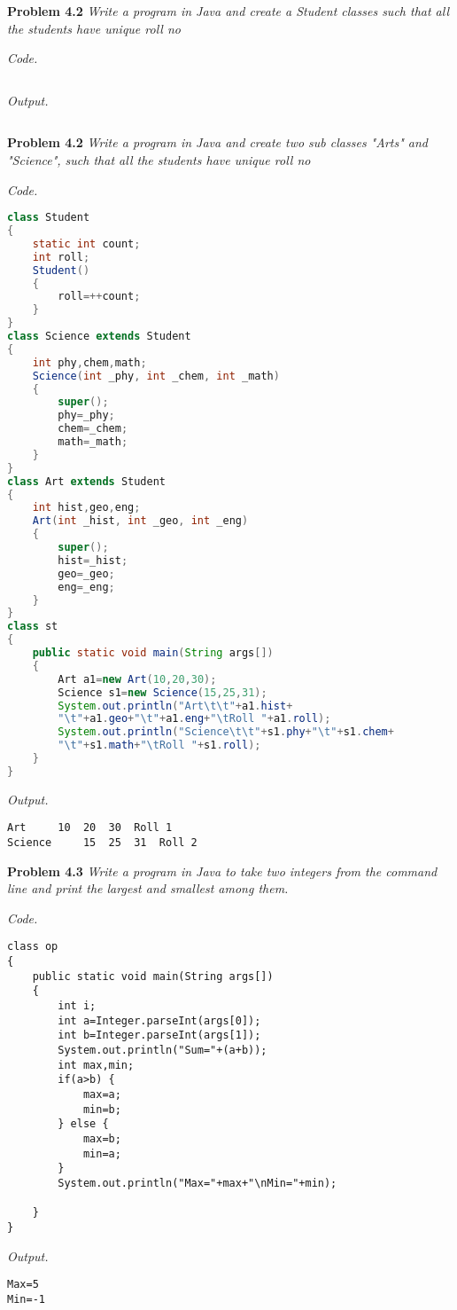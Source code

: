 \documentclass[12pt]{article}
\begin{document}
\textbf{Problem 4.2} \textit{Write a program in Java and create a Student classes such that all the students have unique roll no}

\textit{Code.}
\begin{lstlisting}
\end{lstlisting}

\textit{Output.}
\begin{lstlisting}
\end{lstlisting}

\textbf{Problem 4.2} \textit{Write a program in Java and create two sub classes "Arts" and "Science", such that all the students have unique roll no}


\textit{Code.}

\begin{lstlisting}[language=Java]
class Student
{
	static int count;
	int roll;
	Student()
	{
		roll=++count;
	}
}
class Science extends Student
{
	int phy,chem,math;
	Science(int _phy, int _chem, int _math)
	{
		super();
		phy=_phy;
		chem=_chem;
		math=_math;
	}
}
class Art extends Student
{
	int hist,geo,eng;
	Art(int _hist, int _geo, int _eng)
	{
		super();
		hist=_hist;
		geo=_geo;
		eng=_eng;
	}
}
class st
{
	public static void main(String args[])
	{
		Art a1=new Art(10,20,30);
		Science s1=new Science(15,25,31);
		System.out.println("Art\t\t"+a1.hist+
		"\t"+a1.geo+"\t"+a1.eng+"\tRoll "+a1.roll);
		System.out.println("Science\t\t"+s1.phy+"\t"+s1.chem+
		"\t"+s1.math+"\tRoll "+s1.roll);
	}
}
\end{lstlisting}
\textit{Output.}

\begin{lstlisting}
Art		10	20	30	Roll 1
Science		15	25	31	Roll 2
\end{lstlisting}

\textbf{Problem 4.3} \textit{Write a program in Java to take two integers from the command line and print the largest and smallest among them.}


\textit{Code.}

\begin{lstlisting}
class op
{
	public static void main(String args[])
	{
		int i;
		int a=Integer.parseInt(args[0]);
		int b=Integer.parseInt(args[1]);
		System.out.println("Sum="+(a+b));
		int max,min;
		if(a>b) {
			max=a;
			min=b;
		} else {
			max=b;
			min=a;
		}
		System.out.println("Max="+max+"\nMin="+min);

	}
}
\end{lstlisting}
\textit{Output.}

\begin{lstlisting}
Max=5
Min=-1
\end{lstlisting}
\end{document}
